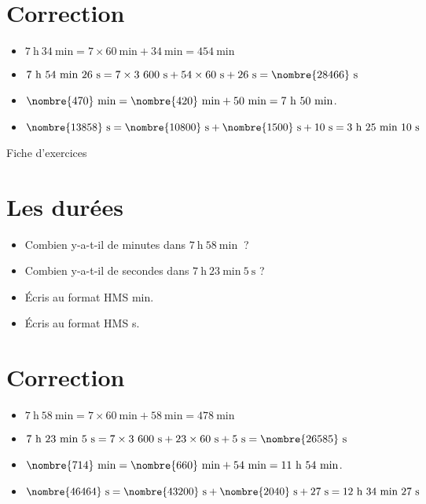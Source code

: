 \documentclass[a4paper,11pt,fleqn]{article}
\begin{document}
\section{Correction}
\begin{itemize}
 \item $7~\text{h}~34~\text{min}=7\times60~\text{min}+34~\text{min}=454~\text{min}$
  \item $7~\text{h}~54~\text{min}~26~\text{s}=7\times3~600~\text{s}+54\times60~\text{s}+26~\text{s}=\nombre{28466}~\text{s}$
  \item $\nombre{470}~\text{min}=\nombre{420}~\text{min}+50~\text{min}=7~\text{h}~50~\text{min}$.
  \item $\nombre{13858}~\text{s}=\nombre{10800}~\text{s}+\nombre{1500}~\text{s}+10~\text{s}=3~\text{h}~25~\text{min}~10~\text{s}$ \end{itemize}


\newpage
\setcounter{exo}{0}
\setcounter{section}{0}
\begin{center}
	{\huge Fiche d'exercices } 	
\end{center}


\section{Les durées}
\begin{itemize}
  \item Combien y-a-t-il de minutes dans $7~\text{h}~58~\text{min}~$ ?
  \item Combien y-a-t-il de secondes dans $7~\text{h}~23~\text{min}~5~\text{s}$ ?
  \item Écris au format HMS  min.
  \item Écris au format HMS  s.
\end{itemize}

\section{Correction}
\begin{itemize}
 \item $7~\text{h}~58~\text{min}=7\times60~\text{min}+58~\text{min}=478~\text{min}$
  \item $7~\text{h}~23~\text{min}~5~\text{s}=7\times3~600~\text{s}+23\times60~\text{s}+5~\text{s}=\nombre{26585}~\text{s}$
  \item $\nombre{714}~\text{min}=\nombre{660}~\text{min}+54~\text{min}=11~\text{h}~54~\text{min}$.
  \item $\nombre{46464}~\text{s}=\nombre{43200}~\text{s}+\nombre{2040}~\text{s}+27~\text{s}=12~\text{h}~34~\text{min}~27~\text{s}$ \end{itemize}
\end{document}
